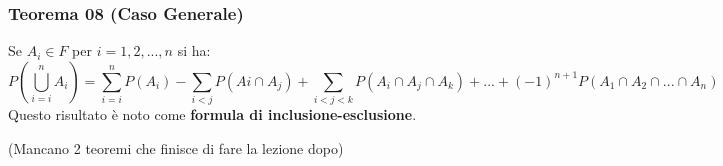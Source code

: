 \subsubsection{Teorema 08 (Caso Generale)}
Se $A_i \in F$ per $i = 1,2,...,n$ si ha:
$$ P(\bigcup_{i=i}^n A_i) = \sum_{i=i}^n P(A_i) - \sum_{i<j} P(Ai \cap A_j) + \sum_{i<j<k} P(A_i \cap A_j \cap A_k) +...+ (-1)^{n+1} P(A_1 \cap A_2 \cap ... \cap A_n)$$
Questo risultato è noto come \textbf{formula di inclusione-esclusione}.

(Mancano 2 teoremi che finisce di fare la lezione dopo)









